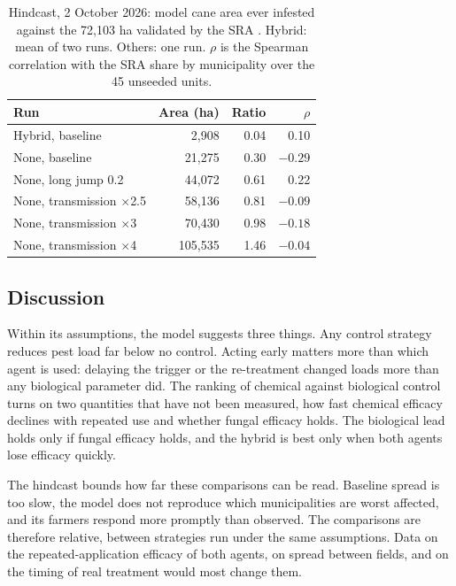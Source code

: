 \begin{table}[!htbp]
\vspace{2ex}
\centering
\small
\caption{Hindcast, 2 October 2026: model cane area ever infested against the 72,103 ha validated by the SRA \citep{SRA2026FOI}. Hybrid: mean of two runs. Others: one run. $\rho$ is the Spearman correlation with the SRA share by municipality over the 45 unseeded units.}
\label{table:hindcast}
\begin{tabular}{lrrr}
\hline\hline
Run & Area (ha) & Ratio & $\rho$ \\ \hline
Hybrid, baseline & 2,908 & 0.04 & 0.10 \\
None, baseline & 21,275 & 0.30 & $-0.29$ \\
None, long jump 0.2 & 44,072 & 0.61 & 0.22 \\
None, transmission $\times$2.5 & 58,136 & 0.81 & $-0.09$ \\
None, transmission $\times$3 & 70,430 & 0.98 & $-0.18$ \\
None, transmission $\times$4 & 105,535 & 1.46 & $-0.04$ \\
\hline\hline
\end{tabular}
\end{table}

\subsection{Discussion}

Within its assumptions, the model suggests three things. Any control strategy reduces pest load far below no control. Acting early matters more than which agent is used: delaying the trigger or the re-treatment changed loads more than any biological parameter did. The ranking of chemical against biological control turns on two quantities that have not been measured, how fast chemical efficacy declines with repeated use and whether fungal efficacy holds. The biological lead holds only if fungal efficacy holds, and the hybrid is best only when both agents lose efficacy quickly.

The hindcast bounds how far these comparisons can be read. Baseline spread is too slow, the model does not reproduce which municipalities are worst affected, and its farmers respond more promptly than observed. The comparisons are therefore relative, between strategies run under the same assumptions. Data on the repeated-application efficacy of both agents, on spread between fields, and on the timing of real treatment would most change them.
